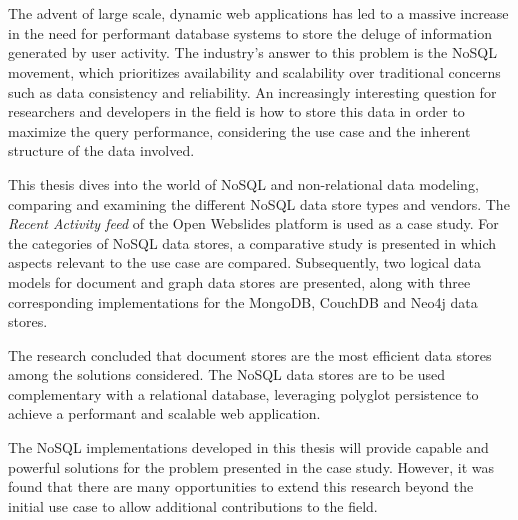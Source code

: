 \chapter*{}

The advent of large scale, dynamic web applications has led to a massive increase in the need for performant database systems to store the deluge of information generated by user activity.
The industry's answer to this problem is the NoSQL movement, which prioritizes availability and scalability over traditional concerns such as data consistency and reliability.
An increasingly interesting question for researchers and developers in the field is how to store this data in order to maximize the query performance, considering the use case and the inherent structure of the data involved.

This thesis dives into the world of NoSQL and non-relational data modeling, comparing and examining the different NoSQL data store types and vendors.
The \textit{Recent Activity feed} of the Open Webslides platform is used as a case study.
For the  categories of NoSQL data stores, a comparative study is presented in which aspects relevant to the use case are compared.
Subsequently, two logical data models for document and graph data stores are presented, along with three corresponding implementations for the MongoDB, CouchDB and Neo4j data stores.

The research concluded that document stores are the most efficient data stores among the solutions considered.
The NoSQL data stores are to be used complementary with a relational database, leveraging polyglot persistence to achieve a performant and scalable web application.

The NoSQL implementations developed in this thesis will provide capable and powerful solutions for the problem presented in the case study.
However, it was found that there are many opportunities to extend this research beyond the initial use case to allow additional contributions to the field.
